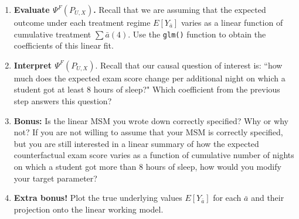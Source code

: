 \documentclass[answers]{exam}
\begin{document}
\begin{enumerate}
\noindent{}
\item \textbf{Evaluate $\Psi^F(P_{U,X})$.}  Recall that we are assuming that the expected outcome under each treatment regime $E[Y_{\bar{a}}]$ varies as a linear function of cumulative treatment $\sum\bar{a}(4)$. Use the \texttt{glm()} function to obtain the coefficients of this linear fit.
\item \textbf{Interpret $\Psi^F(P_{U,X})$}. Recall that our causal question of interest is: ``how much does the expected exam score change per additional night on which a student got at least 8 hours of sleep?" Which coefficient from the previous step answers this question?
\item \textbf{Bonus:} Is the linear MSM you wrote down correctly specified? Why or why not? If you are not willing to assume that your MSM is correctly specified, but you are still interested in a linear summary of how the expected counterfactual exam score varies as a function of cumulative number of nights on which a student got more than 8 hours of sleep, how would you modify your target parameter?
\item \textbf{Extra bonus!} Plot the true underlying values $E[Y_{\bar{a}}]$ for each $\bar{a}$ and their projection onto the linear working model.
\end{enumerate}
\end{document}

